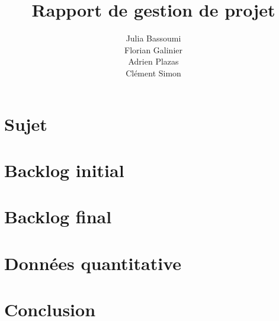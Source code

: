 \documentclass[a4paper,11pt]{report}
\title{Rapport de gestion de projet}
\author{Julia Bassoumi\\Florian Galinier\\Adrien Plazas\\Clément Simon}
\begin{document}
\maketitle
\tableofcontents

\chapter{Sujet}


\chapter{Backlog initial}


\chapter{Backlog final}


\chapter{Données quantitative}


\chapter{Conclusion}

\end{document}
